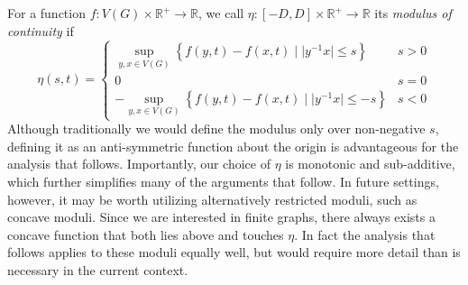 For a function $f:V(G)\times\mathbb{R}^+ \longrightarrow \mathbb{R}$, we call $\eta:[-D,D]\times\mathbb{R}^+\longrightarrow \mathbb{R}$ its \textit{modulus of continuity} if
\begin{equation}\label{eqn:modulus}
    \eta(s,t) = \begin{cases}
    			\sup_{y,x\in V(G)} \left\{ f(y,t)-f(x,t) \; \vert \; \lvert y^{-1}x\rvert \leq s \right\} & s >0 \\
    			0 & s=0 \\
    			-\sup_{y,x\in V(G)} \left\{ f(y,t)-f(x,t) \; \vert \; \lvert y^{-1}x\rvert \leq -s \right\} & s <0 
    			\end{cases}
\end{equation}
Although traditionally we would define the modulus only over non-negative $s$, defining it as an anti-symmetric function about the origin is advantageous for the analysis that follows. Importantly, our choice of $\eta$ is monotonic and sub-additive, which further simplifies many of the arguments that follow. In future settings, however, it may be worth utilizing alternatively restricted moduli, such as concave moduli. Since we are interested in finite graphs, there always exists a concave function that both lies above and touches $\eta$. In fact the analysis that follows applies to these moduli equally well, but would require more detail than is necessary in the current context.

